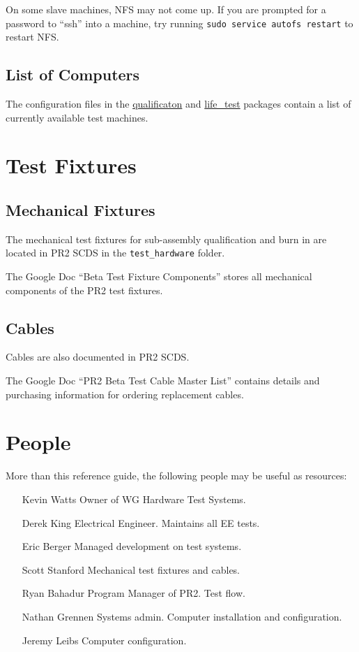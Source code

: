 \documentclass[11pt]{report}
\begin{document}
On some slave machines, NFS may not come up. If you are prompted for a password to ``ssh'' into a machine, try running \texttt{sudo service autofs restart} to restart NFS.

\section{List of Computers}

The configuration files in the \href{http://www.ros.org/wiki/qualification}{qualificaton} and \href{http://www.ros.org/wiki/life\_test}{life\_test} packages contain a list of currently available test machines. 

\chapter{Test Fixtures}

\section{Mechanical Fixtures}

The mechanical test fixtures for sub-assembly qualification and burn in are located in PR2 SCDS in the \texttt{test\_hardware} folder.

The Google Doc ``Beta Test Fixture Components'' stores all mechanical components of the PR2 test fixtures.

\section{Cables}

Cables are also documented in PR2 SCDS.

The Google Doc ``PR2 Beta Test Cable Master List'' contains details and purchasing information for ordering replacement cables.


\chapter {People}

More than this reference guide, the following people may be useful as resources:
\begin{itemize}
\item [Kevin Watts] Owner of WG Hardware Test Systems.
\item [Derek King] Electrical Engineer. Maintains all EE tests.
\item [Eric Berger] Managed development on test systems.
\item [Scott Stanford] Mechanical test fixtures and cables.
\item [Ryan Bahadur] Program Manager of PR2. Test flow.
\item [Nathan Grennen] Systems admin. Computer installation and configuration.
\item [Jeremy Leibs] Computer configuration.
\end{itemize}
\end{document}

